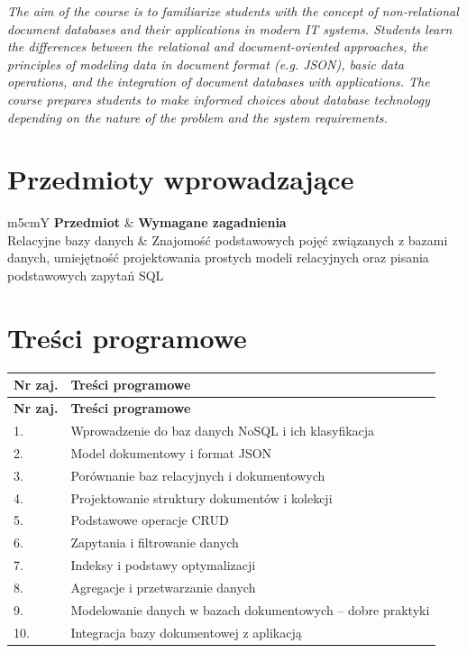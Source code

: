 \documentclass[12pt, a4paper]{article}
\newcommand{\thdrule}{\noalign{\global\setlength{\extrarowheight}{0pt}}}
\newcommand{\thdend}{\noalign{\global\setlength{\extrarowheight}{3pt}}}
\begin{document}
\textit{The aim of the course is to familiarize students with the concept of non-relational document databases and their applications in modern IT systems. Students learn the differences between the relational and document-oriented approaches, the principles of modeling data in document format (e.g. JSON), basic data operations, and the integration of document databases with applications. The course prepares students to make informed choices about database technology depending on the nature of the problem and the system requirements.}


\section{Przedmioty wprowadzające}

{\scriptsize
\begin{tabularx}{\textwidth}{m{5cm}Y}
\thdrule\toprule
{} {\color{white}\textbf{Przedmiot}} & {\color{white}\textbf{Wymagane zagadnienia}} \\
\midrule\thdend
   Relacyjne bazy danych & Znajomość podstawowych pojęć związanych z bazami danych, umiejętność projektowania prostych modeli relacyjnych oraz pisania podstawowych zapytań SQL \\
\bottomrule
\end{tabularx}}

\section{Treści programowe}

{\scriptsize
\begin{longtable}{m{1.5cm}m{14.5cm}}
\thdrule\toprule
\rowcolor{pjatkRed} {\color{white}\textbf{Nr zaj.}} & {\color{white}\textbf{Treści programowe}} \\
\midrule\thdend
\endfirsthead
\thdrule\toprule
\rowcolor{pjatkRed} {\color{white}\textbf{Nr zaj.}} & {\color{white}\textbf{Treści programowe}} \\
\midrule\thdend
\endhead
  \rowcolor{tableRowLight} 1. & Wprowadzenie do baz danych NoSQL i ich klasyfikacja \\
  \rowcolor{tableRowAlt} 2. & Model dokumentowy i format JSON \\
  \rowcolor{tableRowLight} 3. & Porównanie baz relacyjnych i dokumentowych \\
  \rowcolor{tableRowAlt} 4. & Projektowanie struktury dokumentów i kolekcji \\
  \rowcolor{tableRowLight} 5. & Podstawowe operacje CRUD \\
  \rowcolor{tableRowAlt} 6. & Zapytania i filtrowanie danych \\
  \rowcolor{tableRowLight} 7. & Indeksy i podstawy optymalizacji \\
  \rowcolor{tableRowAlt} 8. & Agregacje i przetwarzanie danych \\
  \rowcolor{tableRowLight} 9. & Modelowanie danych w bazach dokumentowych – dobre praktyki \\
  \rowcolor{tableRowAlt} 10. & Integracja bazy dokumentowej z aplikacją \\
\bottomrule
\end{longtable}}
\end{document}
